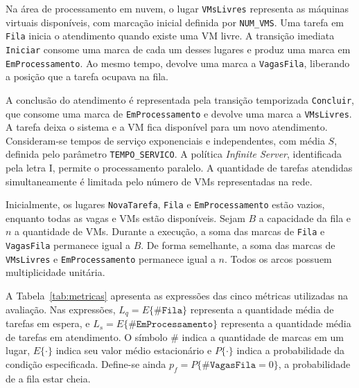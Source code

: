 \documentclass[conference]{IEEEtran}
\begin{document}
Na área de processamento em nuvem, o lugar
\texttt{VMsLivres} representa as máquinas virtuais
disponíveis, com marcação inicial definida por
\texttt{NUM\_VMS}. Uma tarefa em \texttt{Fila} inicia
o atendimento quando existe uma VM livre. A transição
imediata \texttt{Iniciar} consome uma marca de cada
um desses lugares e produz uma marca em
\texttt{EmProcessamento}. Ao mesmo tempo, devolve uma
marca a \texttt{VagasFila}, liberando a posição que
a tarefa ocupava na fila.

A conclusão do atendimento é representada pela transição
temporizada \texttt{Concluir}, que consome uma marca de
\texttt{EmProcessamento} e devolve uma marca a
\texttt{VMsLivres}. A tarefa deixa o sistema e a VM
fica disponível para um novo atendimento. Consideram-se
tempos de serviço exponenciais e independentes, com média
$S$, definida pelo parâmetro \texttt{TEMPO\_SERVICO}.
A política \textit{Infinite Server}, identificada pela
letra I, permite o processamento paralelo. A quantidade
de tarefas atendidas simultaneamente é limitada pelo
número de VMs representadas na rede.

Inicialmente, os lugares \texttt{NovaTarefa},
\texttt{Fila} e \texttt{EmProcessamento} estão vazios,
enquanto todas as vagas e VMs estão disponíveis.
Sejam $B$ a capacidade da fila e $n$ a quantidade de VMs.
Durante a execução, a soma das marcas de \texttt{Fila}
e \texttt{VagasFila} permanece igual a $B$. De forma
semelhante, a soma das marcas de \texttt{VMsLivres} e
\texttt{EmProcessamento} permanece igual a $n$.
Todos os arcos possuem multiplicidade unitária.

A Tabela~\ref{tab:metricas} apresenta as expressões das
cinco métricas utilizadas na avaliação. Nas expressões,
$L_q=E\{\#\texttt{Fila}\}$ representa a quantidade média
de tarefas em espera, e
$L_s=E\{\#\texttt{EmProcessamento}\}$ representa a
quantidade média de tarefas em atendimento.
O símbolo $\#$ indica a quantidade de marcas em um lugar,
$E\{\cdot\}$ indica seu valor médio estacionário e
$P\{\cdot\}$ indica a probabilidade da condição especificada.
Define-se ainda $p_f=P\{\#\texttt{VagasFila}=0\}$,
a probabilidade de a fila estar cheia.
\end{document}
